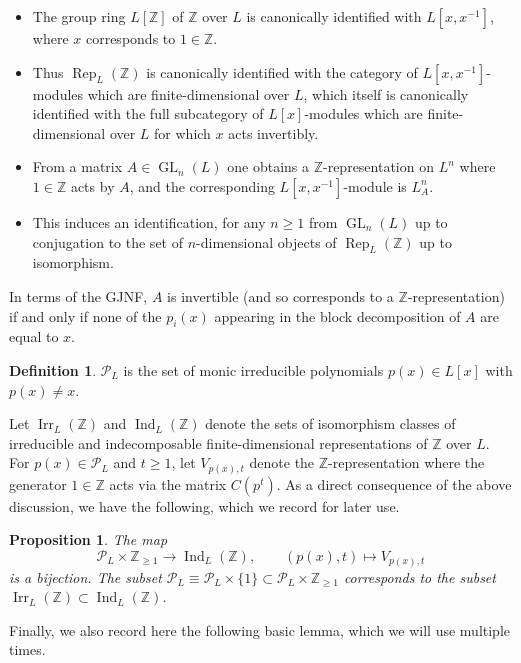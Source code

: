 \documentclass[10pt, reqno, hidelinks]{amsart}
\DeclareMathOperator{\Rep}{Rep}
\DeclareMathOperator{\Ind}{Ind}
\DeclareMathOperator{\Irr}{Irr}
\DeclareMathOperator{\GL}{GL}
\newcommand{\bZ}{{\mathbb Z}}
\newcommand{\sP}{{\mathcal P}}
\numberwithin{thm}{subsection}
\newtheorem{prop}[thm]{Proposition}
\theoremstyle{definition}
\newtheorem{defn}[thm]{Definition}
\begin{document}
\begin{itemize}
	\item The group ring $L[\bZ]$ of $\bZ$ over $L$ is canonically identified with $L[x,x^{-1}]$, where $x$ corresponds to $1 \in \bZ$.
	
	\item Thus $\Rep_L(\bZ)$ is canonically identified with the category of $L[x,x^{-1}]$-modules which are finite-dimensional over $L$, which itself is canonically identified with the full subcategory of $L[x]$-modules which are finite-dimensional over $L$ for which $x$ acts invertibly.
	
	\item From a matrix $A \in \GL_n(L)$ one obtains a $\bZ$-representation on $L^n$ where $1 \in \bZ$ acts by $A$, and the corresponding $L[x,x^{-1}]$-module is $L^n_A$.
	
	\item This induces an identification, for any $n \geq 1$ from $\GL_n(L)$ up to conjugation to the set of $n$-dimensional objects of $\Rep_L(\bZ)$ up to isomorphism.
\end{itemize}

In terms of the GJNF, $A$ is invertible (and so corresponds to a $\bZ$-representation) if and only if none of the $p_i(x)$ appearing in the block decomposition of $A$ are equal to $x$. 

\begin{defn}
	$\sP_{L}$ is the set of monic irreducible polynomials $p(x) \in L[x]$ with $p(x) \neq x$.
\end{defn}

Let $\Irr_L(\bZ)$ and $\Ind_L(\bZ)$ denote the sets of isomorphism classes of irreducible and indecomposable finite-dimensional representations of $\bZ$ over $L$. For $p(x) \in \sP_L$ and $t \geq 1$, let $V_{p(x),t}$ denote the $\bZ$-representation where the generator $1 \in \bZ$ acts via the matrix $C(p^t)$. As a direct consequence of the above discussion, we have the following, which we record for later use.

\begin{prop}\label{prop:indZreps}
	The map
	\[
	\sP_L \times \bZ_{\geq 1} \rightarrow \Ind_L(\bZ), \qquad (p(x),t) \mapsto V_{p(x),t}
	\]
	is a bijection. The subset $\sP_L \equiv \sP_L \times \{1\} \subset \sP_L \times \bZ_{\geq 1}$ corresponds to the subset $\Irr_L(\bZ) \subset \Ind_L(\bZ)$.
\end{prop}

Finally, we also record here the following basic lemma, which we will use multiple times.
\end{document}
